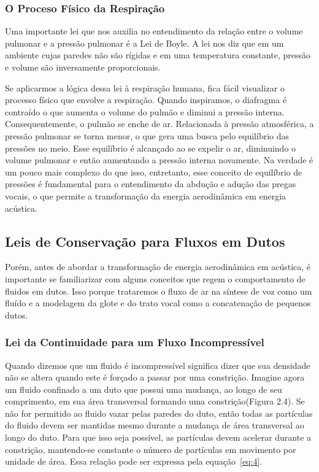	\subsubsection{O Proceso Físico da Respiração}
	
	Uma importante lei que nos auxilia no entendimento da relação entre o volume pulmonar e a pressão pulmonar é a Lei de Boyle. A lei nos diz que em um ambiente cujas paredes não são rígidas e em uma temperatura constante, pressão e volume são inversamente proporcionais.
	
	Se aplicarmos a lógica dessa lei à respiração humana, ﬁca fácil visualizar o processo físico que envolve a respiração. Quando inspiramos, o diafragma é contraído o que aumenta o volume do pulmão e diminui a pressão interna. Consequentemente, o pulmão se enche de ar. Relacionada à pressão atmosférica, a pressão pulmonar se torna menor, o que gera uma busca pelo equilíbrio das pressões no meio. Esse equilíbrio é alcançado ao se expelir o ar, diminuindo o volume pulmonar e então aumentando a pressão interna novamente. Na verdade é um pouco mais complexo do que isso, entretanto, esse conceito de equilíbrio de pressões é fundamental para o entendimento da abdução e adução das pregas vocais, o que permite a transformação da energia aerodinâmica em energia acústica.
	
	\subsection{Leis de Conservação para Fluxos em Dutos}
	
	Porém, antes de abordar a transformação de energia aerodinâmica em acústica, é importante se familiarizar com alguns conceitos que regem o comportamento de ﬂuidos em dutos. Isso porque trataremos o ﬂuxo de ar na síntese de voz como um ﬂuído e a modelagem da glote e do trato vocal como a concatenação de pequenos dutos.
	
	\subsubsection{Lei da Continuidade para um Fluxo Incompressível}
	
	Quando dizemos que um ﬂuido é incompressível signiﬁca dizer que sua densidade não se altera quando este é forçado a passar por uma constrição. Imagine agora um ﬂuido conﬁnado a um duto que possui uma mudança, ao longo de seu comprimento, em sua área transversal formando uma constrição(Figura 2.4). Se não for permitido ao ﬂuido vazar pelas paredes do duto, então todas as partículas do ﬂuido devem ser mantidas mesmo durante a mudança de área transversal ao longo do duto. Para que isso seja possível, as partículas devem acelerar durante a constrição, mantendo-se constante o número de partículas em movimento por unidade de área. Essa relação pode ser expressa pela equação~\ref{eq:4}.
	
